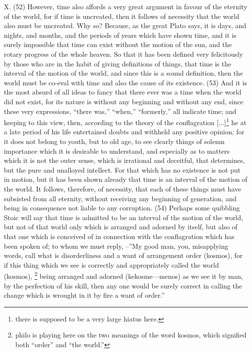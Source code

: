 X. (52) However, time also affords a very great argument in favour of the eternity of the world, for
if time is uncreated, then it follows of necessity that the world also must be uncreated. Why so?
Because, as the great Plato says, it is days, and nights, and months, and the periods of years
which have shown time, and it is surely impossible that time can exist without the motion of the sun,
and the rotary progress of the whole heaven. So that it has been defined very felicitously by those
who are in the habit of giving definitions of things, that time is the interval of the motion of the world,
and since this is a sound definition, then the world must be co-eval with time and also the cause of
its existence. (53) And it is the most absurd of all ideas to fancy that there ever was a time when
the world did not exist, for its nature is without any beginning and without any end, since these very
expressions, ``there was,'' ``when,'' ``formerly,'' all indicate time; and keeping to this view, then,
according to the theory of the conflagration [...]\footnote{there is supposed to be a very large hiatus here.} he at a
late period of his life entertained doubts and withheld any positive opinion; for it does not belong to
youth, but to old age, to see clearly things of solemn importance which it is desirable to understand,
and especially as to matters which it is not the outer sense, which is irrational and deceitful, that
determines, but the pure and unalloyed intellect. For that which has no existence is not put in
motion, but it has been shown already that time is an interval of the motion of the world. It follows,
therefore, of necessity, that each of these things must have subsisted from all eternity, without
receiving any beginning of generation, and being in consequence not liable to any corruption. (54)
Perhaps some quibbling Stoic will say that time is admitted to be an interval of the motion of the
world, but not of that world only which is arranged and adorned by itself, but also of that one which
is conceived of in connection with the conflagration which has been spoken of; to whom we must
reply, --''My good man, you, misapplying words, call what is disorderliness and a want of
arrangement order (kosmos), for if this thing which we see is correctly and appropriately called the
world (kosmos), \footnote{philo is playing here on the two meanings of the word kosmos, which signified both ``order'' and
``the world.''} being arranged and adorned (kekosme—menos) as we see it by man, by the perfection
of his skill, then any one would be surely correct in calling the change which is wrought in it by fire a
want of order.''

